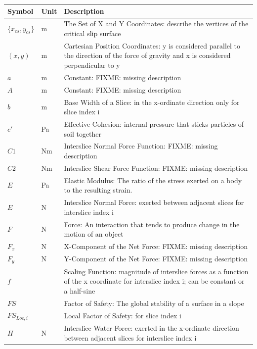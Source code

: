 \documentclass[12pt]{article}
\renewcommand{\arraystretch}{1}
\begin{document}
\renewcommand{\arraystretch}{1.6}
\setlength{\tabcolsep}{20pt}
\begin{longtable}{  l  l  p{8.5cm}  }
\hline
\textbf{Symbol} & \textbf{Unit} & \textbf{Description} \\
\hline
$\{{x_{cs}}{,y_{cs}}\}$ & \si{\meter}& The Set of X and Y Coordinates: describe the vertices of the critical slip surface 
\\
$(x,y)$ & \si{\meter}& Cartesian Position Coordinates: y is considered parallel to the direction of the force of gravity and x is considered perpendicular to y
\\
$a$ & \si{\meter}& Constant: FIXME: missing description
\\
$A$ & \si{\meter}& Constant: FIXME: missing description
\\
$b$ & \si{\meter}& Base Width of a Slice: in the x-ordinate direction only for slice index i
\\
$c'$ & \si{\pascal} & Effective Cohesion: internal pressure that sticks particles of soil together 
\\
$C1$ &  N\si{\meter}&Interslice Normal Force Function: FIXME: missing description 
\\
$C2$ &  N\si{\meter}&Interslice Shear Force Function: FIXME: missing description
\\
$E$ & \si{\pascal} & Elastic Modulus: The ratio of the stress exerted on a body to the resulting strain.
\\
$E$ & \si{\newton} & Interslice Normal Force: exerted between adjacent slices for interslice index i
\\
$F$ &\si{\newton} & Force: An interaction that tends to produce change in the motion of an object 
\\
${F_{x}}$ & \si{\newton} &X-Component of the Net Force: FIXME: missing description
\\
${F_{y}}$ & \si{\newton} &Y-Component of the Net Force: FIXME: missing description
\\
$f$ & & Scaling Function: magnitude of interslice forces as a function of the x coordinate for interslice index i; can be constant or a half-sine
\\
$FS$ & &Factor of Safety: The global stability of a surface in a slope  
\\
${FS_{Loc,i}}$ & & Local Factor of Safety: for slice index i  
\\
$H$ & \si{\newton} &Interslice Water Force: exerted in the x-ordinate direction between adjacent slices for interslice index i
\\

\end{longtable}
\end{document}
